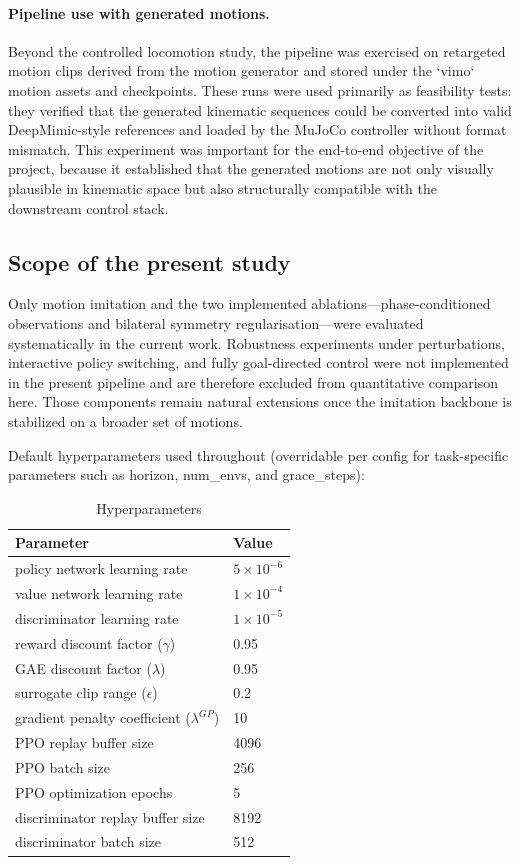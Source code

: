 \paragraph{Pipeline use with generated motions.}
Beyond the controlled locomotion study, the pipeline was exercised on retargeted motion clips derived from the motion generator and stored under the `vimo` motion assets and checkpoints. These runs were used primarily as feasibility tests: they verified that the generated kinematic sequences could be converted into valid DeepMimic-style references and loaded by the MuJoCo controller without format mismatch. This experiment was important for the end-to-end objective of the project, because it established that the generated motions are not only visually plausible in kinematic space but also structurally compatible with the downstream control stack.

\subsection{Scope of the present study}
Only motion imitation and the two implemented ablations---phase-conditioned observations and bilateral symmetry regularisation---were evaluated systematically in the current work. Robustness experiments under perturbations, interactive policy switching, and fully goal-directed control were not implemented in the present pipeline and are therefore excluded from quantitative comparison here. Those components remain natural extensions once the imitation backbone is stabilized on a broader set of motions.

Default hyperparameters used throughout (overridable per config for task-specific parameters such as horizon, num\_envs, and grace\_steps):

\begin{table}[htbp]
\centering
\caption{Hyperparameters}
\begin{tabular}{ll}
\toprule
Parameter & Value \\
\midrule
policy network learning rate & $5 \times 10^{-6}$ \\
value network learning rate & $1 \times 10^{-4}$ \\
discriminator learning rate & $1 \times 10^{-5}$ \\
reward discount factor ($\gamma$) & 0.95 \\
GAE discount factor ($\lambda$) & 0.95 \\
surrogate clip range ($\epsilon$) & 0.2 \\
gradient penalty coefficient ($\lambda^{GP}$) & 10 \\
PPO replay buffer size & 4096 \\
PPO batch size & 256 \\
PPO optimization epochs & 5 \\
discriminator replay buffer size & 8192 \\
discriminator batch size & 512 \\
\bottomrule
\end{tabular}
\label{tab:hyperparams}
\end{table}

